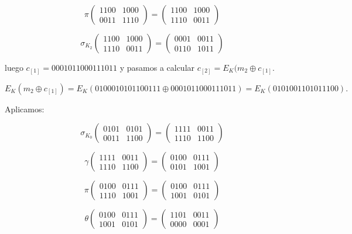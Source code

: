 \documentclass[a4paper]{article}
\begin{document}
$$\pi \begin{pmatrix} 1100 & 1000 \\ 0011 & 1110 \end{pmatrix} = \begin{pmatrix} 1100 & 1000 \\ 1110 & 0011 \end{pmatrix}$$

$$\sigma_{K_2} \begin{pmatrix} 1100 & 1000 \\ 1110 & 0011 \end{pmatrix} = \begin{pmatrix} 0001 & 0011 \\ 0110 & 1011 \end{pmatrix}$$

luego $c_{[1]} = 0001 0110 0011 1011$ y pasamos a calcular $c_{[2]} = E_K(m_2 \oplus c_{[1]}$.

$$E_K(m_2 \oplus c_{[1]}) = E_K( 0100 0101 0110 0111 \oplus 0001 0110 0011 1011) = E_K(0101 0011 0101 1100).$$

Aplicamos:

$$\sigma_{K_0} \begin{pmatrix} 0101 & 0101 \\ 0011 & 1100 \end{pmatrix} = \begin{pmatrix} 1111 & 0011 \\ 1110 & 1100 \end{pmatrix}$$

$$\gamma \begin{pmatrix} 1111 & 0011 \\ 1110 & 1100 \end{pmatrix} = \begin{pmatrix} 0100 & 0111 \\ 0101 & 1001 \end{pmatrix}$$

$$\pi \begin{pmatrix} 0100 & 0111 \\ 1110 & 1001 \end{pmatrix} = \begin{pmatrix} 0100 & 0111 \\ 1001 & 0101 \end{pmatrix}$$

$$\theta \begin{pmatrix} 0100 & 0111 \\ 1001 & 0101 \end{pmatrix} = \begin{pmatrix} 1101 & 0011 \\ 0000 & 0001 \end{pmatrix}$$
\end{document}
